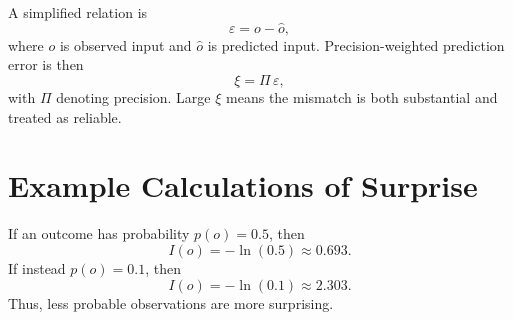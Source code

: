 \documentclass[a4paper,11pt]{article}
\begin{document}
        A simplified relation is
        \begin{equation}
            \varepsilon = o - \hat{o},
        \end{equation}
        where $o$ is observed input and $\hat{o}$ is predicted input. Precision-weighted prediction error is then
        \begin{equation}
            \xi = \Pi \, \varepsilon,
        \end{equation}
        with $\Pi$ denoting precision. Large $\xi$ means the mismatch is both substantial and treated as reliable.
        
        \begin{center}
        \end{center}
    
    
    \section{Example Calculations of Surprise}
        If an outcome has probability $p(o)=0.5$, then
        \begin{equation}
            I(o) = -\ln(0.5) \approx 0.693.
        \end{equation}
        If instead $p(o)=0.1$, then
        \begin{equation}
            I(o) = -\ln(0.1) \approx 2.303.
        \end{equation}
        Thus, less probable observations are more surprising.
        
\end{document}
